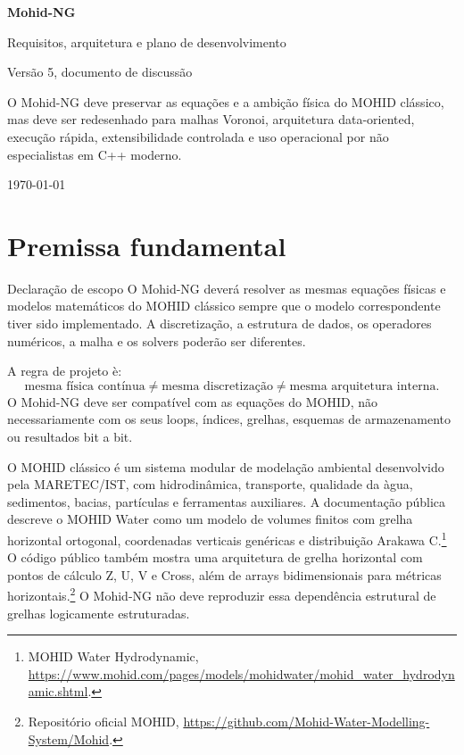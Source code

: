 \documentclass[11pt,a4paper]{article}
\begin{document}
\begin{titlepage}
\centering
\vspace*{14mm}
{\Huge\bfseries\color{MohidBlue} Mohid-NG\par}
\vspace{3mm}
{\Large\color{MohidInk} Requisitos, arquitetura e plano de desenvolvimento\par}
\vspace{5mm}
{\large\color{MohidGray} Vers\~ao 5, documento de discuss\~ao\par}
\vfill
\begin{tcolorbox}[colback=MohidBlue!5,width=0.86\textwidth]
\large
O Mohid-NG deve preservar as equa\c{c}\~oes e a ambi\c{c}\~ao f\'isica do MOHID cl\'assico, mas deve ser redesenhado para malhas Voronoi, arquitetura data-oriented, execu\c{c}\~ao r\'apida, extensibilidade controlada e uso operacional por n\~ao especialistas em C++ moderno.
\end{tcolorbox}
\vfill
{\color{MohidGray}\today\par}
\end{titlepage}

\tableofcontents
\newpage

\section{Premissa fundamental}

\begin{principlebox}{Declara\c{c}\~ao de escopo}
O Mohid-NG dever\'a resolver as mesmas equa\c{c}\~oes f\'isicas e modelos matem\'aticos do MOHID cl\'assico sempre que o modelo correspondente tiver sido implementado. A discretiza\c{c}\~ao, a estrutura de dados, os operadores num\'ericos, a malha e os solvers poder\~ao ser diferentes.
\end{principlebox}

A regra de projeto \`e:
\[
\text{mesma f\'isica cont\'inua}\neq\text{mesma discretiza\c{c}\~ao}\neq\text{mesma arquitetura interna}.
\]
O Mohid-NG deve ser compat\'ivel com as equa\c{c}\~oes do MOHID, n\~ao necessariamente com os seus loops, \'{i}ndices, grelhas, esquemas de armazenamento ou resultados bit a bit.

O MOHID cl\'assico \'e um sistema modular de modela\c{c}\~ao ambiental desenvolvido pela MARETEC/IST, com hidrodin\^amica, transporte, qualidade da \`agua, sedimentos, bacias, part\'iculas e ferramentas auxiliares. A documenta\c{c}\~ao p\'ublica descreve o MOHID Water como um modelo de volumes finitos com grelha horizontal ortogonal, coordenadas verticais gen\'ericas e distribui\c{c}\~ao Arakawa C.\footnote{MOHID Water Hydrodynamic, \url{https://www.mohid.com/pages/models/mohidwater/mohid_water_hydrodynamic.shtml}.} O c\'odigo p\'ublico tamb\'em mostra uma arquitetura de grelha horizontal com pontos de c\'alculo Z, U, V e Cross, al\'em de arrays bidimensionais para m\'etricas horizontais.\footnote{Reposit\'orio oficial MOHID, \url{https://github.com/Mohid-Water-Modelling-System/Mohid}.} O Mohid-NG n\~ao deve reproduzir essa depend\^encia estrutural de grelhas logicamente estruturadas.
\end{document}

